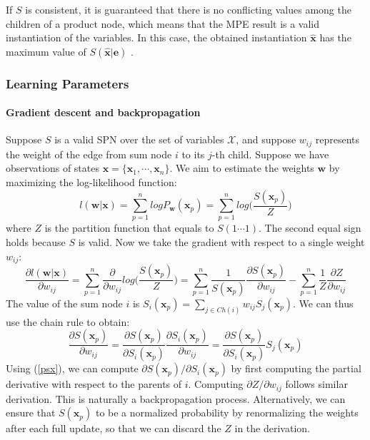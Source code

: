 \documentclass[11pt, titlepage]{article}
\theoremstyle{definition}
\newcommand\mb{\mathbf}
\begin{document}
If $S$ is consistent, it is guaranteed that there is no conflicting values among the children of a product node, which means that the MPE result is a valid instantiation of the variables. In this case, the obtained instantiation $\hat{\mb{x}}$ has the maximum value of $S(\hat{\mb{x}}|\mb{e})$ \cite{poon2011sum}.

\subsubsection{Learning Parameters}

\paragraph{Gradient descent and backpropagation} Suppose $S$ is a valid SPN over the set of variables $\mathcal{X}$, and suppose $w_{ij}$ represents the weight of the edge from sum node $i$ to its $j$-th child. Suppose we have observations of states $\mb{x}=\{\mb{x}_1,\cdots,\mb{x}_n\}$. We aim to estimate the weights $\mb{w}$ by maximizing the log-likelihood function:
\begin{equation}
l(\mb{w}|\mb{x})=\sum_{p=1}^{n}logP_{\mb{w}}(\mb{x}_p)=\sum_{p=1}^{n}log\Big(\frac{S(\mb{x}_p)}{Z}\Big)
\end{equation}
where $Z$ is the partition function that equals to $S(1\cdots1)$. The second equal sign holds because $S$ is valid. Now we take the gradient with respect to a single weight $w_{ij}$:
\begin{equation}
\label{dl}
\frac{\partial l(\mb{w}|\mb{x})}{\partial w_{ij}}=\sum_{p=1}^{n}\frac{\partial}{\partial w_{ij}}log\Big(\frac{S(\mb{x}_p)}{Z}\Big)=\sum_{p=1}^{n}\frac{1}{S(\mb{x}_p)}\frac{\partial S(\mb{x}_p)}{\partial w_{ij}}-\sum_{p=1}^{n}\frac{1}{Z}\frac{\partial Z}{\partial w_{ij}}
\end{equation}
The value of the sum node $i$ is $S_i(\mb{x}_p)=\sum_{j\in Ch(i)}w_{ij}S_j(\mb{x}_p)$. We can thus use the chain rule to obtain:
\begin{equation}
\frac{\partial S(\mb{x}_p)}{\partial w_{ij}} = \frac{\partial S(\mb{x}_p)}{\partial S_i(\mb{x}_p)}\frac{\partial S_i(\mb{x}_p)}{\partial w_{ij}}=\frac{\partial S(\mb{x}_p)}{\partial S_i(\mb{x}_p)}S_j(\mb{x}_p)
\end{equation}
Using (\ref{psx}), we can compute $\partial S(\mb{x}_p)/\partial S_i(\mb{x}_p)$ by first computing the partial derivative with respect to the parents of $i$. Computing $\partial Z/\partial w_{ij}$ follows similar derivation. This is naturally a backpropagation process. Alternatively, we can ensure that $S(\mb{x}_p)$ to be a normalized probability by renormalizing the weights after each full update, so that we can discard the $Z$ in the derivation.
\end{document}
